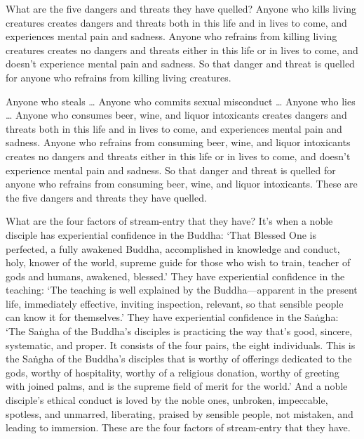 \documentclass[12pt,openany]{book}%
\begin{document}
What are the five dangers and threats they have quelled? Anyone who kills living creatures creates dangers and threats both in this life and in lives to come, and experiences mental pain and sadness. Anyone who refrains from killing living creatures creates no dangers and threats either in this life or in lives to come, and doesn’t experience mental pain and sadness. So that danger and threat is quelled for anyone who refrains from killing living creatures. 

Anyone who steals … Anyone who commits sexual misconduct … Anyone who lies … Anyone who consumes beer, wine, and liquor intoxicants creates dangers and threats both in this life and in lives to come, and experiences mental pain and sadness. Anyone who refrains from consuming beer, wine, and liquor intoxicants creates no dangers and threats either in this life or in lives to come, and doesn’t experience mental pain and sadness. So that danger and threat is quelled for anyone who refrains from consuming beer, wine, and liquor intoxicants. These are the five dangers and threats they have quelled. 

What are the four factors of stream-entry that they have? It’s when a noble disciple has experiential confidence in the Buddha: ‘That Blessed One is perfected, a fully awakened Buddha, accomplished in knowledge and conduct, holy, knower of the world, supreme guide for those who wish to train, teacher of gods and humans, awakened, blessed.’ They have experiential confidence in the teaching: ‘The teaching is well explained by the Buddha—apparent in the present life, immediately effective, inviting inspection, relevant, so that sensible people can know it for themselves.’ They have experiential confidence in the \textsanskrit{Saṅgha}: ‘The \textsanskrit{Saṅgha} of the Buddha’s disciples is practicing the way that’s good, sincere, systematic, and proper. It consists of the four pairs, the eight individuals. This is the \textsanskrit{Saṅgha} of the Buddha’s disciples that is worthy of offerings dedicated to the gods, worthy of hospitality, worthy of a religious donation, worthy of greeting with joined palms, and is the supreme field of merit for the world.’ And a noble disciple’s ethical conduct is loved by the noble ones, unbroken, impeccable, spotless, and unmarred, liberating, praised by sensible people, not mistaken, and leading to immersion. These are the four factors of stream-entry that they have. 
\end{document}

